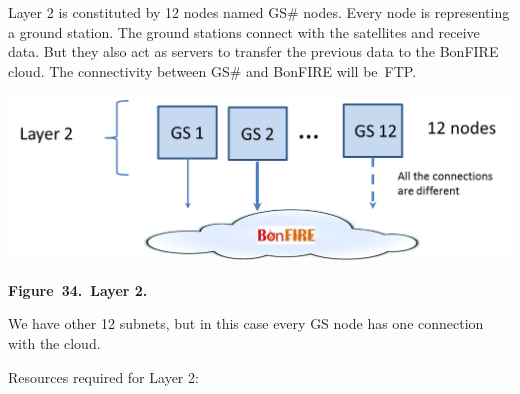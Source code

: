 \documentclass[a4paper]{article}
\begin{document}
Layer 2 is constituted by 12 nodes named GS\# nodes. Every node is
representing a ground station. The ground stations connect with the
satellites and receive data. But they also act as servers to transfer
the previous data to the BonFIRE cloud. The connectivity between GS\#
and BonFIRE will be\ FTP.


\bigskip

{\centering 
\includegraphics[width=5.41165in,height=1.73875in]{out-img42.png} \par}

{\centering\bfseries
Figure\ 34.\ Layer 2.
\par}


\bigskip

We have other 12 subnets, but in this case every GS node has one
connection with the cloud.


\bigskip

Resources required for Layer 2:\ 


\bigskip
\end{document}
